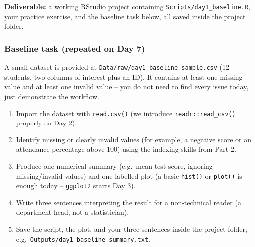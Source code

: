 \documentclass[11pt]{article}
\newenvironment{Shaded}{\begin{snugshade}}{\end{snugshade}}
\newcommand{\AttributeTok}[1]{\textcolor[rgb]{0.13,0.29,0.53}{#1}}
\newcommand{\FunctionTok}[1]{\textcolor[rgb]{0.13,0.29,0.53}{\textbf{#1}}}
\newcommand{\NormalTok}[1]{#1}
\newcommand{\OtherTok}[1]{\textcolor[rgb]{0.56,0.35,0.01}{#1}}
\newcommand{\SpecialCharTok}[1]{\textcolor[rgb]{0.81,0.36,0.00}{\textbf{#1}}}
\newcommand{\StringTok}[1]{\textcolor[rgb]{0.31,0.60,0.02}{#1}}
\providecommand{\tightlist}{%
  \setlength{\itemsep}{0pt}\setlength{\parskip}{0pt}}
\begin{document}
\textbf{Deliverable:} a working RStudio project containing
\texttt{Scripts/day1\_baseline.R}, your practice exercise, and the
baseline task below, all saved inside the project folder.

\hypertarget{baseline-task-repeated-on-day-7}{%
\subsubsection{Baseline task (repeated on Day
7)}\label{baseline-task-repeated-on-day-7}}

A small dataset is provided at
\texttt{Data/raw/day1\_baseline\_sample.csv} (12 students, two columns
of interest plus an ID). It contains at least one missing value and at
least one invalid value -- you do not need to find every issue today,
just demonstrate the workflow.

\begin{enumerate}
\def\labelenumi{\arabic{enumi}.}
\tightlist
\item
  Import the dataset with \texttt{read.csv()} (we introduce
  \texttt{readr::read\_csv()} properly on Day 2).
\item
  Identify missing or clearly invalid values (for example, a negative
  score or an attendance percentage above 100) using the indexing skills
  from Part 2.
\item
  Produce one numerical summary (e.g.~mean test score, ignoring
  missing/invalid values) and one labelled plot (a basic \texttt{hist()}
  or \texttt{plot()} is enough today -- \texttt{ggplot2} starts Day 3).
\item
  Write three sentences interpreting the result for a non-technical
  reader (a department head, not a statistician).
\item
  Save the script, the plot, and your three sentences inside the project
  folder, e.g.~\texttt{Outputs/day1\_baseline\_summary.txt}.
\end{enumerate}

\begin{Shaded}
\end{Shaded}
\end{document}

